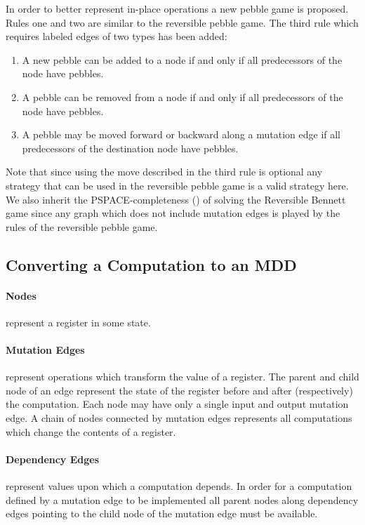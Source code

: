 In order to better represent in-place operations a new pebble game is proposed.
Rules one and two are similar to the reversible pebble game. The third rule
which requires labeled edges of two types has been added:

\begin{enumerate}

   \item A new pebble can be added to a node if and only if all predecessors of
     the node have pebbles.

   \item A pebble can be removed from a node if and only if all predecessors of
     the node have pebbles.

   \item A pebble may be moved forward or backward along a mutation edge if all
     predecessors of the destination node have pebbles.

\end{enumerate}

Note that since using the move described in the third rule is optional any
strategy that can be used in the reversible pebble game is a valid strategy
here. We also inherit the PSPACE-completeness (\cite{chan13}) of solving the
Reversible Bennett game since any graph which does not include mutation edges is
played by the rules of the reversible pebble game.

\subsection{Converting a Computation to an MDD}

\paragraph{Nodes} represent a register in some state.

\paragraph{Mutation Edges} represent operations which transform the value
of a register. The parent and child node of an edge represent the state of the
register before and after (respectively) the computation. Each node may have
only a single input and output mutation edge. A chain of nodes connected by
mutation edges represents all computations which change the contents of a
register.

\paragraph{Dependency Edges} represent values upon which a computation
depends. In order for a computation defined by a mutation edge to be implemented
all parent nodes along dependency edges pointing to the child node of the
mutation edge must be available.

